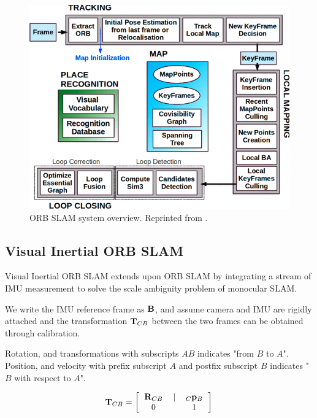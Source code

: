 \begin{figure}
	\centering
	\includegraphics[width=5in]{figures/orb_slam1}
	\caption[ORB SLAM architecture]{\small 
		ORB SLAM system overview. Reprinted from . }
	\label{fig:orb_slam1}
\end{figure}

\subsection{Visual Inertial ORB SLAM}

Visual Inertial ORB SLAM  extends upon ORB SLAM by integrating a stream of IMU measurement to solve the scale ambiguity problem of monocular SLAM.

We write the IMU reference frame as ${\bf B}$, and assume camera and IMU are rigidly attached and the transformation ${\bf T}_{CB}$ between the two frames can be obtained through calibration.

Rotation, and transformations with subscripts $AB$ indicates "from $B$ to $A$". Position, and velocity with prefix subscript $A$ and postfix subscript $B$ indicates "$B$ with respect to $A$".

\begin{equation}
{\bf T}_{CB} = \left [
\begin{tabular}{ccc}
${\bf R}_{CB}$ & $\vert$ & $_C{\bf p}_B$ \\
$0$ & & $1$ \\
\end{tabular}      
\right ] 
\end{equation}

